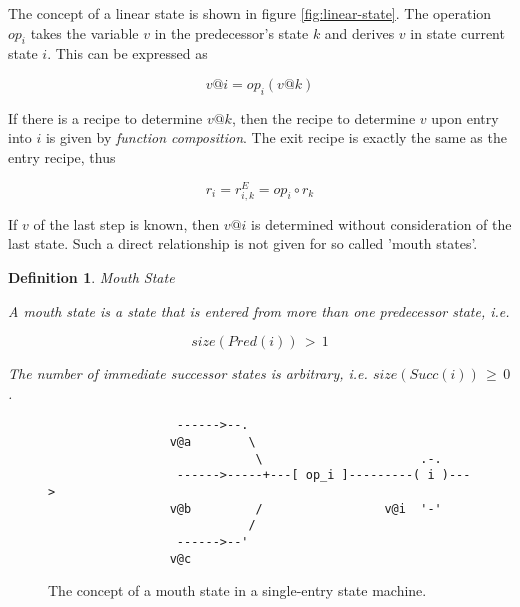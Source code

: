 \documentclass[12pt,a4paper]{scrartcl}
\newtheorem{definition}{Definition}
\begin{document}
The concept of a linear state is shown in figure \eqref{fig:linear-state}. The
operation $op_i$ takes the variable $v$ in the predecessor's state $k$ and
derives $v$ in state current state $i$. This can be expressed as 

\begin{equation} \label{eq:composition}
            v @ i = op_i(v @ k)                                         
\end{equation}

If there is a recipe to determine $v@k$, then the recipe to determine $v$ upon
entry into $i$ is given by \textit{function composition}.  The exit recipe is
exactly the same as the entry recipe, thus

\begin{equation} \label{eq:composition}
    r_i = r^E_{i,k} = op_i \circ r_k
\end{equation}

If $v$ of the last step is known, then $v@i$ is determined without
consideration of the last state.  Such a direct relationship is not given for
so called 'mouth states'.

\begin{definition} Mouth State

    A mouth state is a state that is entered from more than one predecessor
    state, i.e.

    \begin{equation}
                               size(Pred(i))\,>\,1
    \end{equation}

    The number of immediate successor states is arbitrary, i.e.
    $size(Succ(i))\,\ge\,0$.

\end{definition}
    
\begin{figure}[htbp] \leavevmode \label{fig:mouth-state}
\begin{verbatim}
                  ------>--.  
                 v@a        \ 
                             \                      .-.
                  ------>-----+---[ op_i ]---------( i )---> 
                 v@b         /                 v@i  '-'
                            /
                  ------>--'
                 v@c 

\end{verbatim}
\caption{The concept of a mouth state in a single-entry state machine.}
\end{figure}
\end{document}
